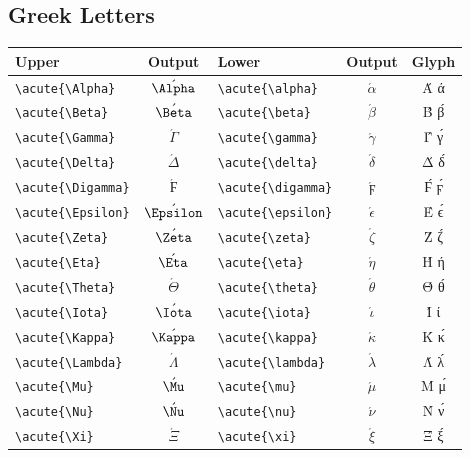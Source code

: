 \documentclass[12pt,a4paper]{article}
\begin{document}
\subsection*{Greek Letters}
\begin{longtable}{|l|c|l|c|c|}
\hline
\textbf{Upper}             & \textbf{Output}    & \textbf{Lower}             & \textbf{Output}       & \textbf{Glyph} \\
\hline
\verb|\acute{\Alpha}|      & $\acute{\Alpha}$   & \verb|\acute{\alpha}|      & $\acute{\alpha}$      & Ά ά \\
\verb|\acute{\Beta}|       & $\acute{\Beta}$    & \verb|\acute{\beta}|       & $\acute{\beta}$       & Β́ β́ \\
\verb|\acute{\Gamma}|      & $\acute{\Gamma}$   & \verb|\acute{\gamma}|      & $\acute{\gamma}$      & Γ́ γ́ \\
\verb|\acute{\Delta}|      & $\acute{\Delta}$   & \verb|\acute{\delta}|      & $\acute{\delta}$      & Δ́ δ́ \\
\verb|\acute{\Digamma}|    & $\acute{\Digamma}$ & \verb|\acute{\digamma}|    & $\acute{\digamma}$    & Ϝ́ ϝ́ \\
\verb|\acute{\Epsilon}|    & $\acute{\Epsilon}$ & \verb|\acute{\epsilon}|    & $\acute{\epsilon}$    & Έ ϵ́ \\
\verb|\acute{\Zeta}|       & $\acute{\Zeta}$    & \verb|\acute{\zeta}|       & $\acute{\zeta}$       & Ζ́ ζ́ \\
\verb|\acute{\Eta}|        & $\acute{\Eta}$     & \verb|\acute{\eta}|        & $\acute{\eta}$        & Ή ή \\
\verb|\acute{\Theta}|      & $\acute{\Theta}$   & \verb|\acute{\theta}|      & $\acute{\theta}$      & Θ́ θ́ \\
\verb|\acute{\Iota}|       & $\acute{\Iota}$    & \verb|\acute{\iota}|       & $\acute{\iota}$       & Ί ί \\
\verb|\acute{\Kappa}|      & $\acute{\Kappa}$   & \verb|\acute{\kappa}|      & $\acute{\kappa}$      & Κ́ κ́ \\
\verb|\acute{\Lambda}|     & $\acute{\Lambda}$  & \verb|\acute{\lambda}|     & $\acute{\lambda}$     & Λ́ λ́ \\
\verb|\acute{\Mu}|         & $\acute{\Mu}$      & \verb|\acute{\mu}|         & $\acute{\mu}$         & Μ́ μ́ \\
\verb|\acute{\Nu}|         & $\acute{\Nu}$      & \verb|\acute{\nu}|         & $\acute{\nu}$         & Ν́ ν́ \\
\verb|\acute{\Xi}|         & $\acute{\Xi}$      & \verb|\acute{\xi}|         & $\acute{\xi}$         & Ξ́ ξ́ \\

\end{longtable}
\end{document}
